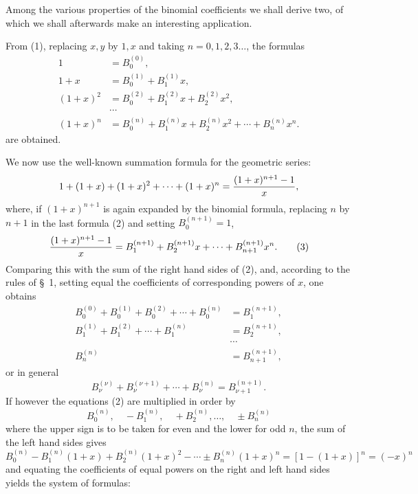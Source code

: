 
Among the various properties of the binomial coefficients we shall derive two, of which we shall afterwards make an interesting application.

From (1), replacing $x,y$ by $1,x$ and taking $n=0,1,2,3\ldots$, the formulas
\begin{equation}
\begin{aligned}
1&=B_0^{(0)},\\
1+x&=B_0^{(1)}+B_1^{(1)}x,\\
(1+x)^2&=B_0^{(2)}+B_1^{(2)}x+B_2^{(2)}x^2,\\
&\cdots\\
(1+x)^n&=B_0^{(n)}+B_1^{(n)}x+B_2^{(n)}x^2+\cdots+B_n^{(n)}x^n.
\end{aligned}
\tag{2}
\end{equation}
are obtained.

We now use the well-known summation formula for the geometric series:
\[
1+(1+x)+(1+x)^2+\cdots+(1+x)^n={(1+x)^{n+1}-1\over x},
\]
where, if $(1+x)^{n+1}$ is again expanded by the binomial formula, replacing $n$ by $n+1$ in the last formula (2) and setting $B_0^{(n+1)}=1$,
\begin{equation}
{(1+x)^{n+1}-1\over x}=B_1^{(n+1)}+B_2^{(n+1)}x+\cdots+B_{n+1}^{(n+1)}x^n.
\tag{3}
\end{equation}
Comparing this with the sum of the right hand sides of (2), and, according to the rules of \S~1, setting equal the coefficients of corresponding powers of $x$, one obtains
\begin{equation}
\begin{aligned}
 B_0^{(0)}+B_0^{(1)}+B_0^{(2)}+\cdots+B_0^{(n)}&=B_1^{(n+1)},\\
 B_1^{(1)}+B_1^{(2)}+\cdots+B_1^{(n)}&=B_2^{(n+1)},\\
&\cdots\\
 B_n^{(n)}&=B_{n+1}^{(n+1)},
\end{aligned}
\tag{4}
\end{equation}
or in general
\begin{equation}
 B_\nu^{(\nu)}+B_\nu^{(\nu+1)}+\cdots+B_\nu^{(n)}=B_{\nu+1}^{(n+1)}.
\tag{5}
\end{equation}
If however the equations (2) are multiplied in order by
\[
 B_0^{(n)},
 \quad -B_1^{(n)},
 \quad +B_2^{(n)},
 \ldots,
 \quad \pm B_n^{(n)}
\]
where the upper sign is to be taken for even and the lower for odd $n$, the sum of the left hand sides gives
\[
B_0^{(n)}-B_1^{(n)}(1+x)+B_2^{(n)}(1+x)^2-\cdots\pm B_n^{(n)}(1+x)^n=[1-(1+x)]^n=(-x)^n
\]
and equating the coefficients of equal powers on the right and left hand sides yields the system of formulas:
